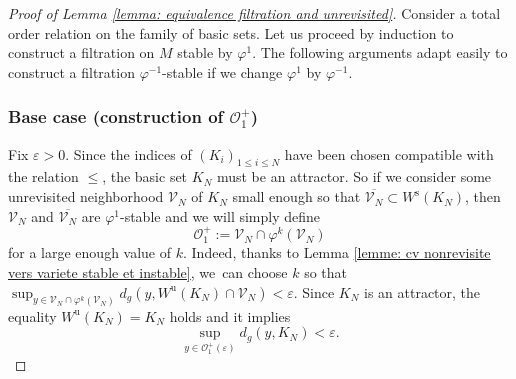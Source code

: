 \documentclass[JEP,XML,SOM,Unicode,NoEqCountersInSection,NoFloatCountersInSection,published]{cedram}
\newcommand{\rs}{\mathrm{s}}
\newcommand{\ru}{\mathrm{u}}
\theoremstyle{definition}
\theoremstyle{plain}
\newcommand{\Ocal}{\mathcal{O}}
\newcommand{\Vcal}{\mathcal{V}}
\begin{document}
\begin{proof}[Proof of Lemma \ref{lemma: equivalence filtration and unrevisited}] Consider a total order relation on the family of basic sets. Let us proceed by induction to construct a filtration on $M$ stable by $\varphi^{1}$. The following arguments adapt easily to construct a filtration $\varphi^{-1}$-stable if we change $\varphi^1$ by $\varphi^{-1}$.

\subsubsection*{Base case (construction of $\Ocal_1^+$)}
Fix $\varepsilon > 0$. Since the indices of $(K_i)_{1 \leq i \leq N}$ have been chosen compatible with the relation $\leq$, the basic set $K_{N}$ must be an attractor. So if we consider some unrevisited neighborhood $\Vcal_{N}$ of $K_N$ small enough so that $\overline{\Vcal_N} \subset W^\rs(K_N)$, then $\Vcal_N$ and $\overline{\Vcal_N}$ are $\varphi^1$-stable and we will simply define
\[
\Ocal_{1}^+:= \Vcal_N \cap \varphi^{k}(\Vcal_{N})
\]
for a large enough value of $k$. Indeed, thanks to Lemma \ref{lemme: cv nonrevisite vers variete stable et instable}, we~can choose $k$ so that $\sup_{y \in \Vcal_N \cap \varphi^{k}(\Vcal_{N})} d_g (y, W^\ru (K_{N}) \cap \Vcal_N) < \varepsilon $. Since $K_N$ is an attractor, the equality $W^\ru (K_N) = K_N$ holds and it implies
\[
\sup_{y \in \Ocal_{1}^+ (\varepsilon)} d_g (y, K_N) < \varepsilon.
\]


\end{proof}
\end{document}
